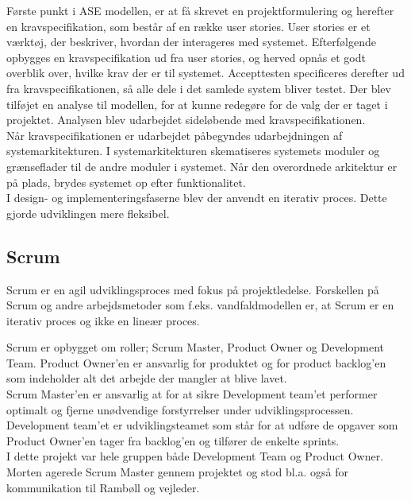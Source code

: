 Første punkt i ASE modellen, er at få skrevet en projektformulering og herefter en kravspecifikation, som består af en række user stories. User stories er et værktøj, der beskriver, hvordan der interageres med systemet. Efterfølgende opbygges en kravspecifikation ud fra user stories, og herved opnås et godt overblik over, hvilke krav der er til systemet. Accepttesten specificeres derefter ud fra kravspecifikationen, så alle dele i det samlede system bliver testet.
Der blev tilføjet en analyse til modellen, for at kunne redegøre for de valg der er taget i projektet. Analysen blev udarbejdet sideløbende med kravspecifikationen. \\
Når kravspecifikationen er udarbejdet påbegyndes udarbejdningen af systemarkitekturen. I systemarkitekturen skematiseres systemets moduler og grænseflader til de andre moduler i systemet. Når den overordnede arkitektur er på plads, brydes systemet op efter funktionalitet. \\
I design- og implementeringsfaserne blev der anvendt en iterativ proces. Dette gjorde udviklingen mere fleksibel. \\

\subsection{Scrum}
Scrum \cite{Scrum} er en agil udviklingsproces med fokus på projektledelse. Forskellen på Scrum og andre arbejdsmetoder som f.eks. vandfaldmodellen\cite{Vandfald} er, at Scrum er en iterativ proces og ikke en lineær proces.

Scrum er opbygget om roller; Scrum Master, Product Owner og Development Team. Product Owner'en er ansvarlig for produktet og for product backlog'en som indeholder alt det arbejde der mangler at blive lavet. \\
Scrum Master'en er ansvarlig at for at sikre Development team'et performer optimalt og fjerne unødvendige forstyrrelser under udviklingsprocessen. \\
Development team'et er udviklingsteamet som står for at udføre de opgaver som Product Owner'en tager fra backlog'en og tilfører de enkelte sprints. \\
I dette projekt var hele gruppen både Development Team og Product Owner. Morten agerede Scrum Master gennem projektet og stod bl.a. også for kommunikation til Rambøll og vejleder. \\



